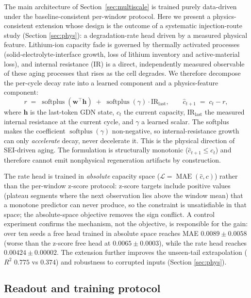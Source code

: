 The main architecture of Section~\ref{sec:multiscale} is trained
purely data-driven under the baseline-consistent per-window protocol.
Here we present a physics-consistent extension whose design is the
outcome of a systematic injection-route study (Section
\ref{sec:phys}): a degradation-rate head driven by a measured
physical feature. Lithium-ion capacity fade is governed by
thermally activated processes (solid-electrolyte-interface growth,
loss of lithium inventory and active-material loss), and internal
resistance (IR) is a direct, independently measured observable of
these aging processes that rises as the cell degrades. We therefore
decompose the per-cycle decay rate into a learned component and a
physics-feature component:
\begin{equation}
\label{eq:rate_head}
r \;=\; \operatorname{softplus}(\mathbf{w}^{\top}\mathbf{h})
\;+\; \operatorname{softplus}(\gamma)\cdot \mathrm{IR}_{\text{last}},
\qquad
\hat{c}_{t+1} \;=\; c_t - r,
\end{equation}
where $\mathbf{h}$ is the last-token GDN state, $c_t$ the current
capacity, $\mathrm{IR}_{\text{last}}$ the measured internal
resistance at the current cycle, and $\gamma$ a learned scalar. The
softplus makes the coefficient $\operatorname{softplus}(\gamma)$
non-negative, so internal-resistance growth can only \emph{accelerate}
decay, never decelerate it. This is the physical direction of SEI-driven
aging. The formulation is structurally monotonic
($\hat{c}_{t+1} \le c_t$) and therefore cannot emit nonphysical
regeneration artifacts by construction.

The rate head is trained in \emph{absolute} capacity space
($\mathcal{L} = \operatorname{MAE}(\hat{c}, c)$) rather than the
per-window z-score protocol: z-score targets include positive values
(plateau segments where the next observation lies above the window
mean) that a monotone predictor can never produce, so the constraint
is unsatisfiable in that space; the absolute-space objective removes
the sign conflict. A control experiment confirms the mechanism, not
the objective, is responsible for the gain: over ten seeds a free head
trained in absolute space reaches MAE $0.0089\pm0.0058$ (worse than
the z-score free head at $0.0065\pm0.0003$), while the rate head
reaches $0.00424\pm0.00002$. The extension
further improves the unseen-tail extrapolation ($R^2$ $0.775$ vs
$0.374$) and robustness to corrupted inputs (Section
\ref{sec:phys}).

\subsection{Readout and training protocol}
\label{sec:readout}

